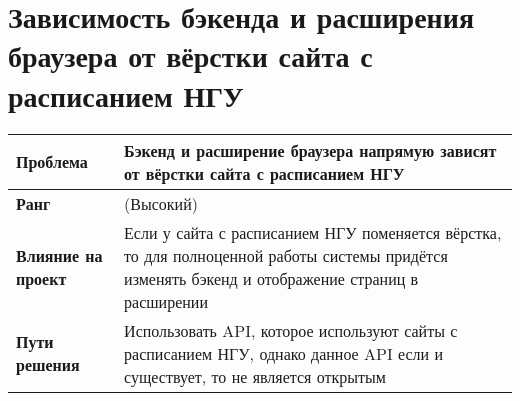 	\section{Зависимость бэкенда и расширения браузера от вёрстки сайта с расписанием НГУ}
		\begin{tabularx}{\textwidth}{
				| >{\centering\arraybackslash\hsize=4cm}X
				| >{\centering\arraybackslash}X
				|}
			\hline
			\textbf{Проблема} &  Бэкенд и расширение браузера напрямую зависят от вёрстки сайта с расписанием НГУ \\\hline
			\textbf{Ранг} &  8 (Высокий) \\\hline
			\textbf{Влияние на проект} & Если у сайта с расписанием НГУ поменяется вёрстка, то для полноценной работы системы придётся изменять бэкенд и отображение страниц в расширении \\\hline
			\textbf{Пути решения} &  Использовать API, которое используют сайты с расписанием НГУ, однако данное API если и существует, то не является открытым \\\hline
		\end{tabularx}
